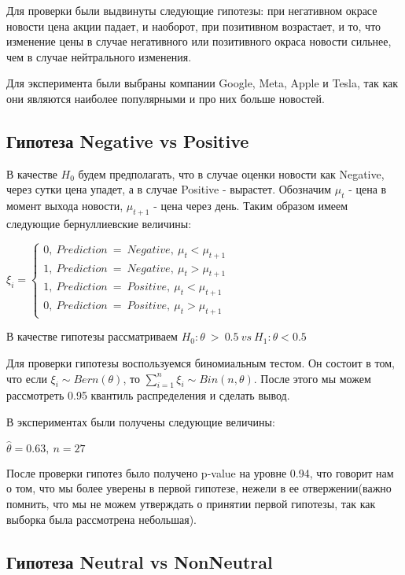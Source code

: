 \documentclass{article}
\begin{document}
Для проверки были выдвинуты следующие гипотезы: при негативном окрасе новости цена акции падает, и наоборот, при позитивном возрастает, и то, что изменение цены в случае негативного или позитивного окраса новости сильнее, чем в случае нейтрального изменения.

Для эксперимента были выбраны компании Google, Meta, Apple и Tesla, так как они являются наиболее популярными и про них больше новостей.

\subsection{Гипотеза Negative vs Positive}

В качестве $H_0$ будем предполагать, что в случае оценки новости как Negative, через сутки цена упадет, а в случае Positive - вырастет. Обозначим $\mu _{t}$ - цена в момент выхода новости, $\mu _{t+1}$ - цена через день. Таким образом имеем следующие бернуллиевские величины:

$\xi _{i} =\begin{cases}
0,\ Prediction\ =\ Negative,\ \mu _{t} < \mu _{t+1}{} & \\
1,\ Prediction\ =\ Negative,\ \mu _{t}  >\mu _{t+1}{} & \\
1,\ Prediction\ =\ Positive,\ \mu _{t} < \mu _{t+1}{} & \\
0,\ Prediction\ =\ Positive,\ \mu _{t}  >\mu _{t+1}{} & 
\end{cases}$

В качестве гипотезы рассматриваем $H_{0} :\theta \  >\ 0.5\ vs\ H_{1} :\theta < 0.5$

Для проверки гипотезы воспользуемся биномиальным тестом. 
Он состоит в том, что если $\xi _{i} \sim Bern( \theta )$, то $\sum _{i=1}^{n} \xi _{i} \sim Bin( n,\theta )$. После этого мы можем рассмотреть 0.95 квантиль распределения и сделать вывод.

В экспериментах были получены следующие величины:

$\hat{\theta } =0.63,\ n=27$

После проверки гипотез было получено p-value на уровне 0.94, что говорит нам о том, что мы более уверены в первой гипотезе, нежели в ее отвержении(важно помнить, что мы не можем утверждать о принятии первой гипотезы, так как выборка была рассмотрена небольшая).

\subsection{Гипотеза Neutral vs NonNeutral}
\end{document}
